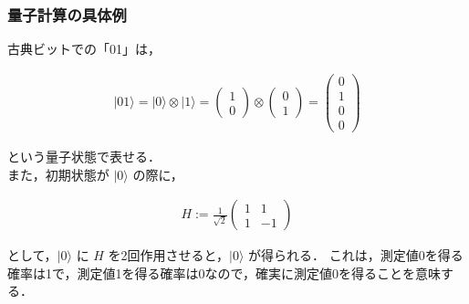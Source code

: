 \documentclass[dvipdfmx,12pt]{beamer}
\begin{document}
\begin{frame}

\frametitle{量子計算の具体例}

古典ビットでの「01」は， \vspace{-25pt}

\begin{align*}
    \displaystyle | 01 \rangle = | 0 \rangle \otimes | 1 \rangle = \left( \begin{array}{c} 1 \\ 0 \end{array} \right) \otimes \left( \begin{array}{c} 0 \\ 1 \end{array} \right) = \left( \begin{array}{c} 0 \\ 1 \\ 0 \\ 0 \end{array} \right)
\end{align*}

という量子状態で表せる．\\
また，初期状態が $ | 0 \rangle $ の際に，\vspace{-25pt}

\begin{align*}
    \displaystyle H := \frac{1}{\sqrt{2}} \left( \begin{array}{cc} 1 & 1 \\ 1 & -1 \end{array} \right)
\end{align*}

として，$ | 0 \rangle $ に $ H $ を2回作用させると，$ | 0 \rangle $ が得られる．
これは，測定値0を得る確率は1で，測定値1を得る確率は0なので，確実に測定値0を得ることを意味する．

\end{frame}
\end{document}

